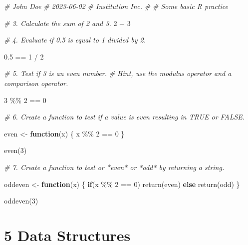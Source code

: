 \documentclass[
]{book}
\newenvironment{Shaded}{\begin{snugshade}}{\end{snugshade}}
\newcommand{\CommentTok}[1]{\textcolor[rgb]{0.56,0.35,0.01}{\textit{#1}}}
\newcommand{\ControlFlowTok}[1]{\textcolor[rgb]{0.13,0.29,0.53}{\textbf{#1}}}
\newcommand{\DecValTok}[1]{\textcolor[rgb]{0.00,0.00,0.81}{#1}}
\newcommand{\FloatTok}[1]{\textcolor[rgb]{0.00,0.00,0.81}{#1}}
\newcommand{\FunctionTok}[1]{\textcolor[rgb]{0.00,0.00,0.00}{#1}}
\newcommand{\NormalTok}[1]{#1}
\newcommand{\OtherTok}[1]{\textcolor[rgb]{0.56,0.35,0.01}{#1}}
\newcommand{\SpecialCharTok}[1]{\textcolor[rgb]{0.00,0.00,0.00}{#1}}
\newcommand{\StringTok}[1]{\textcolor[rgb]{0.31,0.60,0.02}{#1}}
\begin{document}
\begin{Shaded}
\begin{Highlighting}[]
\CommentTok{\# John Doe}
\CommentTok{\# 2023{-}06{-}02}
\CommentTok{\# Institution Inc.}
\CommentTok{\#}
\CommentTok{\# Some basic R practice}

\CommentTok{\# 3.  Calculate the sum of 2 and 3.}
\DecValTok{2} \SpecialCharTok{+} \DecValTok{3}

\CommentTok{\# 4.  Evaluate if 0.5 is equal to 1 divided by 2.}

\FloatTok{0.5} \SpecialCharTok{==} \DecValTok{1} \SpecialCharTok{/} \DecValTok{2}

\CommentTok{\# 5.  Test if 3 is an even number. }
\CommentTok{\#     Hint, use the modulus operator and a comparison operator.}

\DecValTok{3} \SpecialCharTok{\%\%} \DecValTok{2} \SpecialCharTok{==} \DecValTok{0}

\CommentTok{\# 6.  Create a function to test if a value is even resulting in \textasciigrave{}TRUE\textasciigrave{} or \textasciigrave{}FALSE\textasciigrave{}.}

\NormalTok{even }\OtherTok{\textless{}{-}} \ControlFlowTok{function}\NormalTok{(x) \{ x }\SpecialCharTok{\%\%} \DecValTok{2} \SpecialCharTok{==} \DecValTok{0}\NormalTok{ \}}

\FunctionTok{even}\NormalTok{(}\DecValTok{3}\NormalTok{)}

\CommentTok{\# 7.  Create a function to test or *even* or *odd* by returning a string.}

\NormalTok{oddeven }\OtherTok{\textless{}{-}} \ControlFlowTok{function}\NormalTok{(x) \{ }
  \ControlFlowTok{if}\NormalTok{(x }\SpecialCharTok{\%\%} \DecValTok{2} \SpecialCharTok{==} \DecValTok{0}\NormalTok{) }\FunctionTok{return}\NormalTok{(}\StringTok{\textquotesingle{}even\textquotesingle{}}\NormalTok{)}
  \ControlFlowTok{else} \FunctionTok{return}\NormalTok{(}\StringTok{\textquotesingle{}odd\textquotesingle{}}\NormalTok{)}
\NormalTok{\}}

\FunctionTok{oddeven}\NormalTok{(}\DecValTok{3}\NormalTok{)}
\end{Highlighting}
\end{Shaded}

\hypertarget{data-structures}{%
\section*{\texorpdfstring{\textbf{5} Data Structures}{5 Data Structures}}\label{data-structures}}
\end{document}
